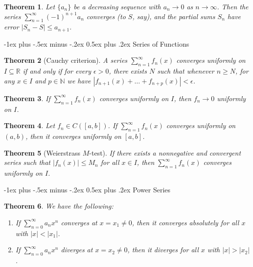 \documentclass[10pt,landscape]{article}
\makeatletter
\newtheorem{theorem}{Theorem}
\newcommand{\R}{\mathbb{R}}
\newcommand{\N}{\mathbb{N}}
\renewcommand{\section}{\@startsection{section}{1}{0mm}%
                                {-1ex plus -.5ex minus -.2ex}%
                                {0.5ex plus .2ex}%
                                {\normalfont\large\bfseries}}
\makeatother
\begin{document}
\begin{multicols}{3}
\begin{theorem}
  Let $\{a_n\}$ be a decreasing sequence with
  $a_n \to 0$ as $n \to \infty$. Then the series
  $\sum_{n = 1}^\infty (-1)^{n + 1} a_n$ converges (to $S$, say), and
  the partial sums $S_n$ have error
  $|S_n - S| \le a_{n + 1}$.
\end{theorem}

\section{Series of Functions}

\begin{theorem}[Cauchy criterion]
  A series $\sum_{n = 1}^\infty f_n(x)$ converges uniformly
  on $I \subseteq \R$ if and only if for every $\epsilon > 0$,
  there exists $N$ such that whenever $n \ge N$,
  for any $x \in I$ and $p \in \N$ we have
  $|f_{n + 1}(x) + \dots + f_{n + p}(x)| < \epsilon$.
\end{theorem}

\begin{theorem}
  If $\sum_{n = 1}^\infty f_n(x)$ converges uniformly
  on $I$, then $f_n \to 0$ uniformly on $I$.
\end{theorem}

\begin{theorem}
  Let $f_n \in C([a, b])$. If $\sum_{n = 1}^\infty f_n(x)$
  converges uniformly on $(a, b)$, then it converges
  uniformly on $[a, b]$.
\end{theorem}

\begin{theorem}[Weierstrass $M$-test]
  If there exists a nonnegative and convergent
  series such that
  $|f_n(x)| \le M_n$ for all $x \in I$, then
  $\sum_{n = 1}^\infty f_n(x)$ converges uniformly
  on $I$.
\end{theorem}

\section{Power Series}
\begin{theorem}
  We have the following:
  \begin{enumerate}
    \item If $\sum_{n = 0}^\infty a_n x^n$ converges
      at $x = x_1 \ne 0$, then it converges absolutely
      for all $x$ with $|x| < |x_1|$.
    \item If $\sum_{n = 0}^\infty a_n x^n$ diverges
      at $x = x_2 \ne 0$, then it diverges for all
      $x$ with $|x| > |x_2|$.
  \end{enumerate}
\end{theorem}


\end{multicols}
\end{document}
